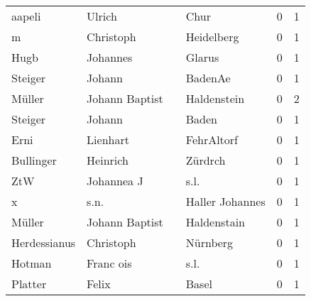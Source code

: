 \begin{tabular}{llllrr}
                   aapeli &                             Ulrich &             &                                        Chur &          0 &         1 \\
                        m &                          Christoph &             &                                  Heidelberg &          0 &         1 \\
                     Hugb &                           Johannes &             &                                      Glarus &          0 &         1 \\
                  Steiger &                             Johann &             &                                     BadenAe &          0 &         1 \\
                   Müller &                     Johann Baptist &             &                                 Haldenstein &          0 &         2 \\
                  Steiger &                             Johann &             &                                       Baden &          0 &         1 \\
                     Erni &                           Lienhart &             &                                  FehrAltorf &          0 &         1 \\
                Bullinger &                           Heinrich &             &                                     Zürdrch &          0 &         1 \\
                      ZtW &                         Johannea J &             &                                        s.l. &          0 &         1 \\
                        x &                               s.n. &             &                             Haller Johannes &          0 &         1 \\
                   Müller &                     Johann Baptist &             &                                 Haldenstain &          0 &         1 \\
             Herdessianus &                          Christoph &             &                                    Nürnberg &          0 &         1 \\
                   Hotman &                          Franc ois &             &                                        s.l. &          0 &         1 \\
                  Platter &                              Felix &             &                                       Basel &          0 &         1 \\

\end{tabular}
